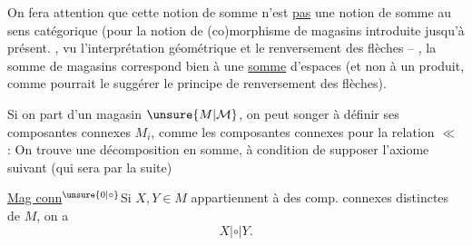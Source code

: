 
On fera attention que cette notion de somme n'est \uline{pas} une notion de somme au sens catégorique (pour la notion de (co)morphisme de magasins introduite jusqu'à présent. , vu l'interprétation géométrique et le renversement des flèches -- , la somme de magasins correspond bien à une \uline{somme} d'espaces (et non à un produit, comme pourrait le suggérer le principe de renversement des flèches).

Si on part d'un magasin $\unsure{M|\mathcal M}$, on peut songer à définir ses composantes connexes $M_i$, comme les composantes connexes pour la relation $\ll$ : On trouve une décomposition en somme, à condition de supposer l'axiome suivant (qui sera   par la suite)

\margin{\rule{0.35pt}{1.5cm}}
\uline{Mag conn$^{\unsure{0|\circ}}$}\quad Si $X,Y\in M$ appartiennent à des comp. connexes distinctes de $M$, on a
\[
X\mathrel{|\circ|}Y.
\]
